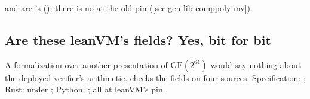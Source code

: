 
 and  are 's ();
there is no  at the old pin (\cref{sec:gen-lib-comppoly-mv}).

\subsection{Are these leanVM's fields? Yes, bit for bit}\label{sec:gen-lib-comppoly-fidelity}

A formalization over another presentation of $\mathrm{GF}(2^{64})$ would say nothing about the
deployed verifier's arithmetic.  checks the fields on four sources.
Specification: \allowbreak{}\allowbreak{}\allowbreak{}; Rust: under
\allowbreak{}\allowbreak{}\allowbreak{}; Python: \allowbreak{}; all at leanVM's
pin .

